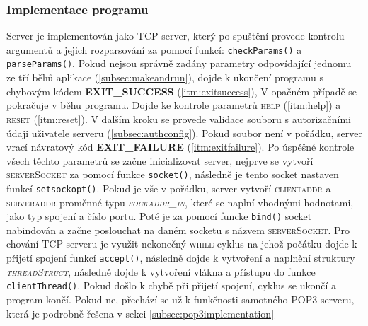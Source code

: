 \documentclass[11pt,a4paper]{report}
\begin{document}
    \subsubsection{Implementace programu}
    \label{subsec:serverimplementation}
    Server je implementován jako TCP server, který po spuštění provede kontrolu argumentů a jejich rozparsování za pomocí funkcí: \texttt{checkParams()} a \texttt{parseParams()}. Pokud nejsou správně zadány parametry odpovídající jednomu ze tří běhů aplikace (\ref{subsec:makeandrun}), dojde k ukončení programu s chybovým kódem \textbf{EXIT\_SUCCESS} (\ref{itm:exitsuccess}), V opačném případě se pokračuje v běhu programu. Dojde ke kontrole parametrů \textsc{help} (\ref{itm:help}) a \textsc{reset} (\ref{itm:reset}). V dalším kroku se provede validace souboru s autorizačními údaji uživatele serveru (\ref{subsec:authconfig}). Pokud soubor není v pořádku, server vrací návratový kód \textbf{EXIT\_FAILURE} (\ref{itm:exitfailure}). Po úspěšné kontrole všech těchto parametrů se začne inicializovat server, nejprve se vytvoří \textsc{serverSocket} za pomocí funkce \texttt{socket()}, následně je tento socket nastaven funkcí \texttt{setsockopt()}. Pokud je vše v pořádku, server vytvoří \textsc{clientaddr} a \textsc{serveraddr} proměnné typu \textit{\textsc{sockaddr\_in}}, které se naplní vhodnými hodnotami, jako typ spojení a číslo portu. Poté je za pomocí funcke \texttt{bind()} socket nabindován a začne poslouchat na daném socketu s názvem \textsc{serverSocket}.
    Pro chování TCP serveru je využit nekonečný \textsc{while} cyklus na jehož počátku dojde k přijetí spojení funkcí \texttt{accept()}, následně dojde k vytvoření a naplnění struktury \textit{\textsc{threadStruct}}, následně dojde k vytvoření vlákna a přístupu do funkce \texttt{clientThread()}. Pokud došlo k chybě při přijetí spojení, cyklus se ukončí a program končí. Pokud ne, přechází se už k funkčnosti samotného POP3 serveru, která je podrobně řešena v sekci \ref{subsec:pop3implementation}
\end{document}
